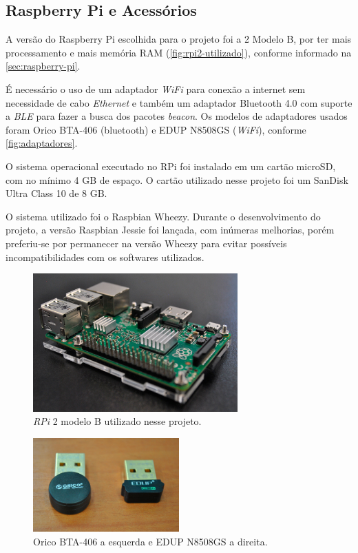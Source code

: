 \subsection{Raspberry Pi e Acessórios}\label{sec:rpi-acessorios}

A versão do Raspberry Pi escolhida para o projeto foi a 2 Modelo B, por ter mais processamento e mais memória RAM (\autoref{fig:rpi2-utilizado}), conforme informado na \autoref{sec:raspberry-pi}.

É necessário o uso de um adaptador \textit{WiFi} para conexão a internet sem necessidade de cabo \textit{Ethernet} e também um adaptador Bluetooth 4.0 com suporte a \textit{BLE} para fazer a busca dos pacotes \textit{beacon}. Os modelos de adaptadores usados foram Orico BTA-406 (bluetooth) e EDUP N8508GS (\textit{WiFi}), conforme \autoref{fig:adaptadores}.

O sistema operacional executado no RPi foi instalado em um cartão microSD, com no mínimo 4 GB de espaço. O cartão utilizado nesse projeto foi um SanDisk Ultra Class 10 de 8 GB. 

O sistema utilizado foi o Raspbian Wheezy. Durante o desenvolvimento do projeto, a versão Raspbian Jessie foi lançada, com inúmeras melhorias, porém preferiu-se por permanecer na versão Wheezy para evitar possíveis incompatibilidades com os softwares utilizados.

\begin{figure}[htb]
	\caption{\label{fig:rpi2-utilizado}\textit{RPi} 2 modelo B utilizado nesse projeto.}
	\begin{center}
		\includegraphics[width=0.7\textwidth]{img/rpi2.jpg}
	\end{center}
\end{figure}

\begin{figure}[htb]
	\caption{\label{fig:adaptadores}Orico BTA-406 a esquerda e EDUP N8508GS a direita.}
	\begin{center}
		\includegraphics[width=0.5\textwidth]{img/adaptadores.jpg}
	\end{center}
\end{figure}

